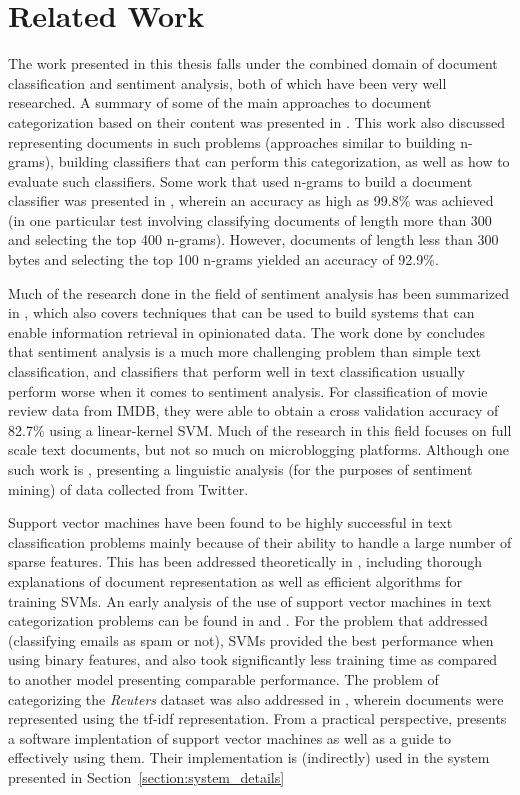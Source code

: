 \chapter{Related Work}
\label{chapter:Related Work}

The work presented in this thesis falls under the combined domain of document classification and sentiment analysis, both of which have been very well researched. A summary of some of the main approaches to document categorization based on their content was presented in \cite{sebastiani2002machine}. This work also discussed representing documents in such problems (approaches similar to building n-grams), building classifiers that can perform this categorization, as well as how to evaluate such classifiers. Some work that used n-grams to build a document classifier was presented in \cite{cavnar1994n}, wherein an accuracy as high as 99.8\% was achieved (in one particular test involving classifying documents of length more than 300 and selecting the top 400 n-grams). However, documents of length less than 300 bytes and selecting the top 100 n-grams yielded an accuracy of 92.9\%.

Much of the research done in the field of sentiment analysis has been summarized in \cite{pang2008opinion}, which also covers techniques that can be used to build systems that can enable information retrieval in opinionated data. The work done by \cite{pang2002thumbs} concludes that sentiment analysis is a much more challenging problem than simple text classification, and classifiers that perform well in text classification usually perform worse when it comes to sentiment analysis. For classification of movie review data from IMDB, they were able to obtain a cross validation accuracy of 82.7\% using a linear-kernel SVM. Much of the research in this field focuses on full scale text documents, but not so much on microblogging platforms. Although one such work is \cite{pak2010twitter}, presenting a linguistic analysis (for the purposes of sentiment mining) of data collected from Twitter.

Support vector machines have been found to be highly successful in text classification problems mainly because of their ability to handle a large number of sparse features. This has been addressed theoretically in \cite{joachims2002learning}, including thorough explanations of document representation as well as efficient algorithms for training SVMs. An early analysis of the use of support vector machines in text categorization problems can be found in \cite{joachims1998text} and \cite{drucker1999support}. For the problem that \cite{drucker1999support} addressed (classifying emails as spam or not), SVMs provided the best performance when using binary features, and also took significantly less training time as compared to another model presenting comparable performance. The problem of categorizing the \emph{Reuters} \cite{reuters} dataset was also addressed in \cite{manevitz2002one}, wherein documents were represented using the tf-idf representation. From a practical perspective, \cite{hsu2003practical} presents a software implentation of support vector machines as well as a guide to effectively using them. Their implementation is (indirectly) used in the system presented in Section~\ref{section:system_details}

